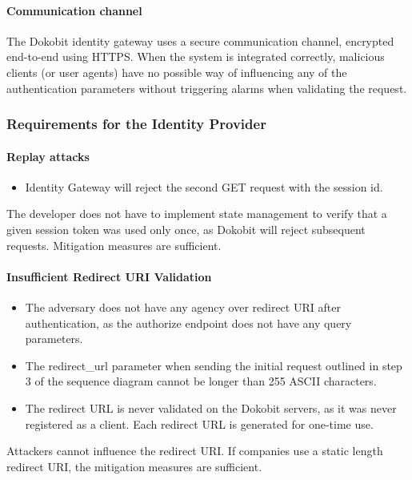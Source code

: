 \paragraph{Communication channel}

The Dokobit identity gateway uses a secure communication channel, encrypted end-to-end using HTTPS. When the system is integrated correctly, malicious clients (or user agents) have no possible way of influencing any of the authentication parameters without triggering alarms when validating the request.

\subsubsection{Requirements for the Identity Provider}

\paragraph{Replay attacks}

\begin{itemize}
  \item Identity Gateway will reject the second GET request with the session id.
\end{itemize}

The developer does not have to implement state management to verify that a given session token was used only once, as Dokobit will reject subsequent requests. Mitigation measures are sufficient.

\paragraph{Insufficient Redirect URI Validation}

\begin{itemize}
  \item The adversary does not have any agency over redirect URI after authentication, as the {authorize} endpoint does not have any query parameters.
  \item The redirect\_url parameter when sending the initial request outlined in step 3 of the sequence diagram cannot be longer than 255 ASCII characters.
  \item The redirect URL is never validated on the Dokobit servers, as it was never registered as a client. Each redirect URL is generated for one-time use.
\end{itemize}

Attackers cannot influence the redirect URI. If companies use a static length redirect URI, the mitigation measures are sufficient.

